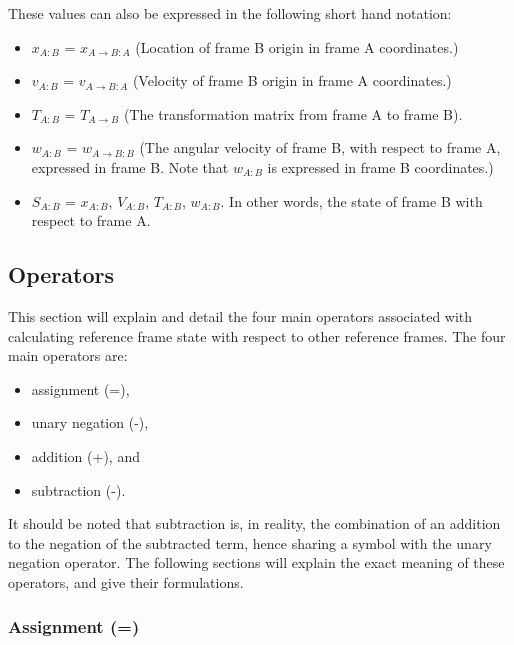 These values can also be expressed in the following short hand notation:

\begin{itemize}
\item{$x_{A:B}$}     = $x_{A \rightarrow B:A}$ (Location of frame B
                                     origin in frame A coordinates.)
\item{$v_{A:B}$}     = $v_{A \rightarrow B:A}$ (Velocity of frame B origin in frame A
                                     coordinates.)
\item{$T_{A:B}$}     = $T_{A \rightarrow B}$ (The transformation matrix from frame A to
                                   frame B).
\item{$w_{A:B}$}     = $w_{A \rightarrow B:B}$ (The angular velocity of frame B, with
respect to frame A, expressed in frame B. Note that $w_{A:B}$ is
expressed in frame B coordinates.)

\item{$S_{A:B}$}     = {$x_{A:B}$, $V_{A:B}$, $T_{A:B}$, $w_{A:B}$}.
In other words, the state of frame B with respect to frame A.
\end{itemize}

\subsection{Operators}

This section will explain and detail the four main operators associated with
calculating reference frame state with respect to other reference frames. The
four main operators are:

\begin{itemize}
\item{assignment (=)},
\item{unary negation (-)},
\item{addition (+)}, and
\item{subtraction (-)}.
\end{itemize}

It should be noted that subtraction is, in reality, the combination of an addition
to the negation of the subtracted term, hence sharing a symbol with the
unary negation operator. The following sections will explain
the exact meaning of these operators, and give their formulations.

\subsubsection{Assignment (=)}

